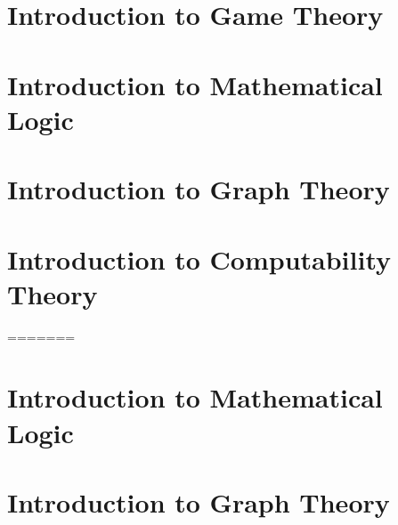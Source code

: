   \part{Introduction to Game Theory}
  

  \part{Introduction to Mathematical Logic}
  \label{part:logic}
  
  

  \part{Introduction to Graph Theory}
  \label{part:graph-theory}
  
  
  

  \part{Introduction to Computability Theory}
  \label{part:computability}
  
  
  
  
  
  
=======
  
  
  
  
  
  
  

  \part{Introduction to Mathematical Logic}
  \label{part:logic}
  
  

  \part{Introduction to Graph Theory}
  \label{part:graph-theory}
  
  
  

